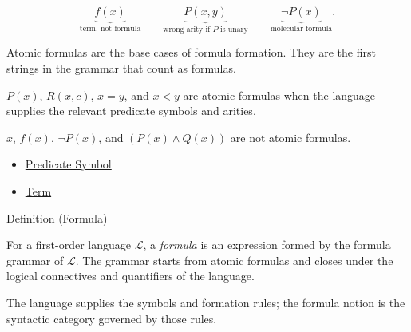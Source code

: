 \begin{remark*}
\[
\underbrace{f(x)}_{\text{term, not formula}}
\qquad
\underbrace{P(x,y)}_{\text{wrong arity if }P\text{ is unary}}
\qquad
\underbrace{\neg P(x)}_{\text{molecular formula}}.
\]
\end{remark*}

\begin{remark*}[Interpretation]
Atomic formulas are the base cases of formula formation. They are the first
strings in the grammar that count as formulas.
\end{remark*}

\begin{remark*}[Examples]
\(P(x)\), \(R(x,c)\), \(x=y\), and \(x<y\) are atomic formulas when the
language supplies the relevant predicate symbols and arities.
\end{remark*}

\begin{remark*}
\(x\), \(f(x)\), \(\neg P(x)\), and \((P(x)\land Q(x))\) are not atomic
formulas.
\end{remark*}

\begin{dependencies}
\begin{itemize}
  \item \hyperref[def:predicate-symbol]{Predicate Symbol}
  \item \hyperref[def:term]{Term}
\end{itemize}
\end{dependencies}

\begin{definitionbox}{Definition (Formula)}
\begin{definition}[Formula]
\label{def:formula}
For a first-order language \(\mathcal L\), a \emph{formula} is an expression
formed by the formula grammar of \(\mathcal L\). The grammar starts from atomic
formulas and closes under the logical connectives and quantifiers of the
language.
\end{definition}
\end{definitionbox}

\begin{remark*}[Interpretation]
The language supplies the symbols and formation rules; the formula notion is
the syntactic category governed by those rules.
\end{remark*}

